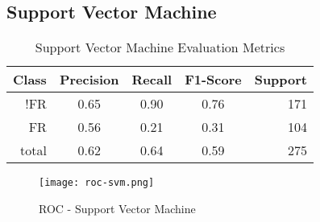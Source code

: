 \documentclass{article}
\begin{document}
\subsection{Support Vector Machine}
\begin{table}[!htb]
\setlength\tabcolsep{0pt} %
\footnotesize\centering
\smallskip 
\begin{tabular*}{\columnwidth}{@{\extracolsep{\fill}}rcccr}
\toprule
  Class&Precision&Recall&F1-Score&Support \\
\midrule
  !FR  & 0.65&0.90&0.76&171\\
  FR & 0.56&0.21&0.31&104 \\
  \midrule
total&0.62&0.64&0.59&275\\
\bottomrule
\end{tabular*}
\caption{Support Vector Machine Evaluation Metrics} \label{tab:svm}
\end{table}

\begin{figure}[h]
\texttt{[image: roc-svm.png]}
\caption{ROC - Support Vector Machine}\label{fig:svm}
\centering
\end{figure}



\end{document}
